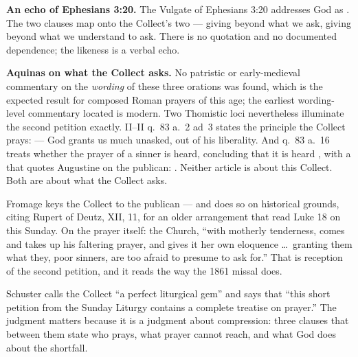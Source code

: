\textbf{An echo of Ephesians 3:20.} The Vulgate of Ephesians 3:20 addresses
God as . The two clauses map onto the Collect's two --- giving beyond
what we ask, giving beyond what we understand to ask. There is no quotation and
no documented dependence; the likeness is a verbal echo.

\textbf{Aquinas on what the Collect asks.} No patristic or early-medieval
commentary on the \textit{wording} of these three orations was found, which is
the expected result for composed Roman prayers of this age; the earliest
wording-level commentary located is modern. Two Thomistic loci nevertheless
illuminate the second petition exactly.  II--II q.~83
a.~2 ad~3 states the principle the Collect prays:  --- God grants us much unasked,
out of his liberality. And q.~83 a.~16 treats whether the prayer of a sinner is
heard, concluding that it is heard , with a  that quotes Augustine on the
publican: . Neither article is about this Collect.
Both are about what the Collect asks.

\begin{witnessnote}
Fromage keys the Collect to the publican --- and does so on historical
grounds, citing Rupert of Deutz,  XII, 11, for an
older arrangement that read Luke 18 on this Sunday. On the prayer itself:
the Church, ``with motherly tenderness, comes and takes up his faltering
prayer, and gives it her own eloquence \dots\ granting them what they, poor
sinners, are too afraid to presume to ask for.'' That is reception of the
second petition, and it reads  the way the 1861 missal does.
\end{witnessnote}

\begin{witnessnote}
Schuster calls the Collect ``a perfect liturgical gem'' and says that ``this
short petition from the Sunday Liturgy contains a complete treatise on
prayer.'' The judgment matters because it is a judgment about
compression: three clauses that between them state who prays, what prayer
cannot reach, and what God does about the shortfall.
\end{witnessnote}

